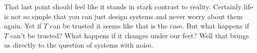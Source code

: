 \documentclass[11pt,a5paper]{article}
\begin{document}
That last point should feel like it stands in stark contrast to reality. Certainly life is not so simple that you can just design systems and never worry about them again. Yet if $T$ can be trusted it seems like that is the case. But what happens if $T$ can't be trusted? What happens if it changes under our feet? Well that brings us directly to the question of systems with noise.  

\newpage



\end{document}
